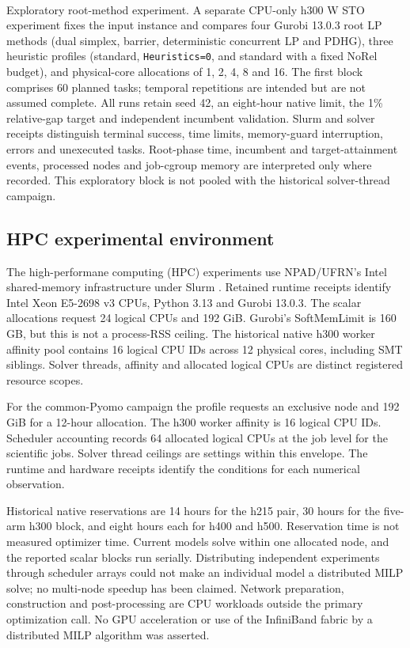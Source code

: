 \documentclass[
  english,
  11pt,
  a4paper,
  authoryear,
  preprint]{elsarticle}
\makeatletter
\let\oldparagraph\paragraph
\renewcommand{\paragraph}{
    \@ifstar
      \xxxParagraphStar
      \xxxParagraphNoStar
  }
\newcommand{\xxxParagraphStar}[1]{\oldparagraph*{#1}\mbox{}}
\newcommand{\xxxParagraphNoStar}[1]{\oldparagraph{#1}\mbox{}}
\makeatother
\begin{document}
\paragraph{Exploratory root-method experiment.} A separate CPU-only h300 W STO experiment fixes the input instance and compares four Gurobi 13.0.3 root LP methods (dual simplex, barrier, deterministic concurrent LP and PDHG), three heuristic profiles (standard, \texttt{Heuristics=0}, and standard with a fixed NoRel budget), and physical-core allocations of 1, 2, 4, 8 and 16. The first block comprises 60 planned tasks; temporal repetitions are intended but are not assumed complete. All runs retain seed 42, an eight-hour native limit, the 1\% relative-gap target and independent incumbent validation. Slurm and solver receipts distinguish terminal success, time limits, memory-guard interruption, errors and unexecuted tasks. Root-phase time, incumbent and target-attainment events, processed nodes and job-cgroup memory are interpreted only where recorded. This exploratory block is not pooled with the historical solver-thread campaign.

\subsection{HPC experimental
environment}\label{hpc-experimental-environment}

The high-performane computing (HPC) experiments use NPAD/UFRN's Intel shared-memory infrastructure under
Slurm \citep{npad2026}. Retained runtime receipts identify Intel Xeon E5-2698 v3 CPUs, Python 3.13 and Gurobi 13.0.3. The scalar allocations request 24 logical CPUs and 192 GiB. Gurobi's SoftMemLimit is 160 GB, but this is not a process-RSS ceiling. The historical native h300 worker affinity pool contains 16 logical CPU IDs across 12 physical cores, including SMT siblings. Solver threads, affinity and allocated logical CPUs are distinct registered resource scopes.

For the common-Pyomo campaign the profile requests an exclusive node and 192 GiB for a 12-hour allocation. The h300 worker affinity is 16 logical CPU IDs. Scheduler accounting records 64 allocated logical CPUs at the job level for the scientific jobs. Solver thread ceilings are settings within this envelope. The runtime and hardware receipts identify the conditions for each numerical observation.

Historical native reservations are 14 hours for the h215 pair, 30 hours for the five-arm h300 block, and eight hours each for h400 and h500.
Reservation time is not measured optimizer time. Current models solve within one allocated node, and the reported scalar blocks run serially.
Distributing independent experiments through scheduler arrays could not make an individual model a distributed MILP solve; no multi-node speedup has been claimed. Network preparation, construction and post-processing are CPU workloads outside the primary optimization call. No GPU acceleration or use of the InfiniBand fabric by a distributed MILP algorithm was
asserted.
\end{document}
